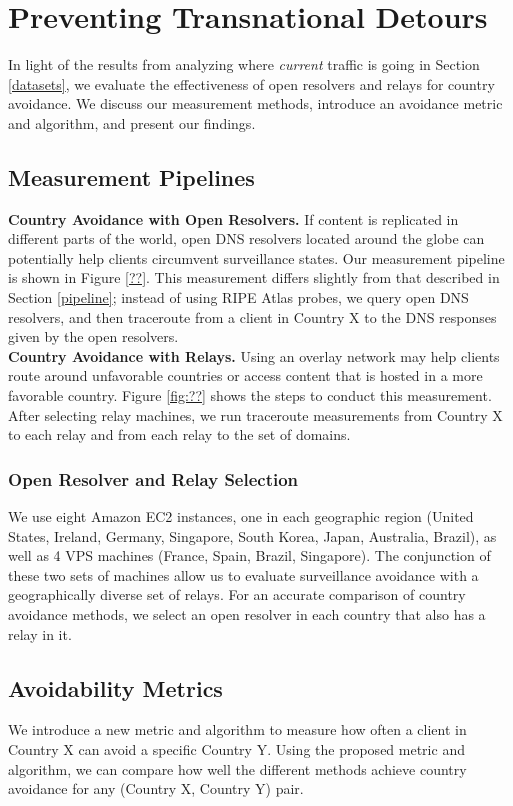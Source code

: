 \section{Preventing Transnational Detours}
\label{avoid_results}
In light of the results from analyzing where \textit{current} traffic is going in Section \ref{datasets}, we evaluate the effectiveness of open resolvers and relays for country avoidance.  We discuss our measurement methods, introduce an avoidance metric and algorithm, and present our findings.

\subsection{Measurement Pipelines}

{\bf Country Avoidance with Open Resolvers.} If content is replicated in different parts of the world, open DNS resolvers located around the globe can potentially help clients circumvent surveillance states.  Our measurement pipeline is shown in Figure \ref{??}.  This measurement differs slightly from that described in Section \ref{pipeline}; instead of using RIPE Atlas probes, we query open DNS resolvers, and then traceroute from a client in Country X to the DNS responses given by the open resolvers.
\\
{\bf Country Avoidance with Relays.} Using an overlay network may help clients route around unfavorable countries or access content that is hosted in a more favorable country.  Figure \ref{fig:??} shows the steps to conduct this measurement.  After selecting relay machines, we run traceroute measurements from Country X to each relay and from each relay to the set of domains. 

\subsubsection{Open Resolver and Relay Selection} 
We use eight Amazon EC2 instances, one in each geographic region (United States, Ireland, Germany, Singapore, South Korea, Japan, Australia, Brazil), as well as 4 VPS machines (France, Spain, Brazil, Singapore).  The conjunction of these two sets of machines allow us to evaluate surveillance avoidance with a geographically diverse set of relays. For an accurate comparison of country avoidance methods, we select an open resolver in each country that also has a relay in it.

\subsection{Avoidability Metrics}
\label{metrics}
We introduce a new metric and algorithm to measure how often a client in Country X can avoid a specific Country Y.  Using the proposed metric and algorithm, we can compare how well the different methods achieve country avoidance for any (Country X, Country Y) pair.

